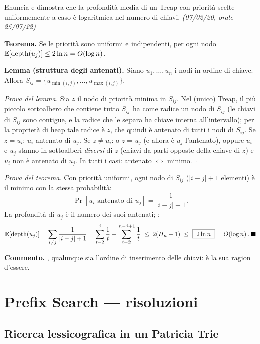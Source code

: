 \begin{domanda}
Enuncia e dimostra che la profondit\`a media di un Treap con priorit\`a scelte uniformemente a
caso \`e logaritmica nel numero di chiavi. \emph{(07/02/20, orale 25/07/22)}
\end{domanda}

\textbf{Teorema.} Se le priorit\`a sono uniformi e indipendenti, per ogni nodo
$\mathbb{E}[\text{depth}(u_j)]\le 2\ln n=O\!\left(\log n\right)$.

\textbf{Lemma (struttura degli antenati).} Siano $u_1,\dots,u_n$ i nodi in ordine di chiave.
Allora  $S_{ij}=\{u_{\min(i,j)},\dots,u_{\max(i,j)}\}$.

\emph{Prova del lemma.} Sia $z$ il nodo di priorit\`a minima in $S_{ij}$. Nel (unico) Treap, il
pi\`u piccolo sottoalbero che contiene tutto $S_{ij}$ ha come radice un nodo di $S_{ij}$ (le
chiavi di $S_{ij}$ sono contigue, e la radice che le separa ha chiave interna all'intervallo);
per la propriet\`a di heap tale radice \`e $z$, che quindi \`e antenato di tutti i nodi di
$S_{ij}$. Se $z=u_i$: $u_i$ antenato di $u_j$. Se $z\ne u_i$: o $z=u_j$ (e allora \`e $u_j$
l'antenato), oppure $u_i$ e $u_j$ stanno in sottoalberi \emph{diversi} di $z$ (chiavi da parti
opposte della chiave di $z$) e $u_i$ non \`e antenato di $u_j$. In tutti i casi: antenato $\iff$
minimo. $\square$

\emph{Prova del teorema.} Con priorit\`a uniformi, ogni nodo di $S_{ij}$ ($|i-j|+1$ elementi) \`e
il minimo con la stessa probabilit\`a:
\[
\Pr[u_i\text{ antenato di }u_j]=\frac{1}{|i-j|+1}.
\]
La profondit\`a di $u_j$ \`e il numero dei suoi antenati; :
\[
\mathbb{E}[\text{depth}(u_j)]
=\sum_{i\ne j}\frac{1}{|i-j|+1}
=\sum_{t=2}^{j}\frac{1}{t}+\sum_{t=2}^{\,n-j+1}\frac{1}{t}
\;\le\;2(H_n-1)\;\le\;\boxed{\ 2\ln n\ }=O\!\left(\log n\right). \;\blacksquare
\]

\textbf{Commento.} , qualunque sia l'ordine
di inserimento delle chiavi: \`e la sua ragion d'essere.

\section{Prefix Search --- risoluzioni}

\subsection*{ Ricerca lessicografica in un Patricia Trie}

